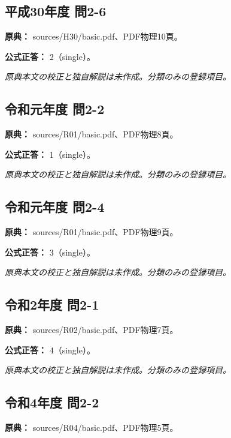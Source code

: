 \subsection{平成30年度 問2-6}
\label{q:h30-reg-basic-2-6}

\noindent\textbf{原典：} sources/H30/basic.pdf、PDF物理10頁。

\textbf{公式正答：} 2（single）。

\par\textit{原典本文の校正と独自解説は未作成。分類のみの登録項目。}

\subsection{令和元年度 問2-2}
\label{q:r01-reg-basic-2-2}

\noindent\textbf{原典：} sources/R01/basic.pdf、PDF物理8頁。

\textbf{公式正答：} 1（single）。

\par\textit{原典本文の校正と独自解説は未作成。分類のみの登録項目。}

\subsection{令和元年度 問2-4}
\label{q:r01-reg-basic-2-4}

\noindent\textbf{原典：} sources/R01/basic.pdf、PDF物理9頁。

\textbf{公式正答：} 3（single）。

\par\textit{原典本文の校正と独自解説は未作成。分類のみの登録項目。}

\subsection{令和2年度 問2-1}
\label{q:r02-reg-basic-2-1}

\noindent\textbf{原典：} sources/R02/basic.pdf、PDF物理7頁。

\textbf{公式正答：} 4（single）。

\par\textit{原典本文の校正と独自解説は未作成。分類のみの登録項目。}

\subsection{令和4年度 問2-2}
\label{q:r04-reg-basic-2-2}

\noindent\textbf{原典：} sources/R04/basic.pdf、PDF物理5頁。

